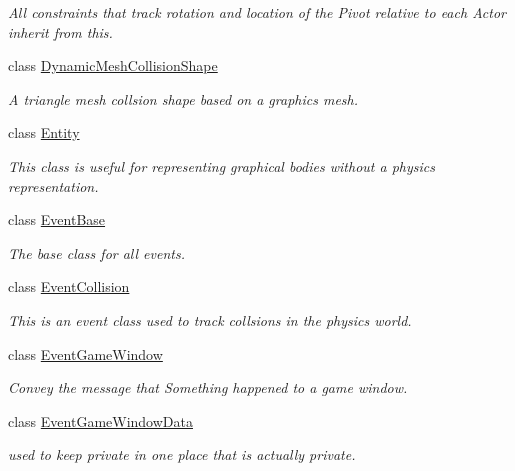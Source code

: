 \begin{DoxyCompactItemize}
\begin{DoxyCompactList}\small\item\em All constraints that track rotation and location of the Pivot relative to each Actor inherit from this. \item\end{DoxyCompactList}\item 
class \hyperlink{classMezzanine_1_1DynamicMeshCollisionShape}{DynamicMeshCollisionShape}
\begin{DoxyCompactList}\small\item\em A triangle mesh collsion shape based on a graphics mesh. \item\end{DoxyCompactList}\item 
class \hyperlink{classMezzanine_1_1Entity}{Entity}
\begin{DoxyCompactList}\small\item\em This class is useful for representing graphical bodies without a physics representation. \item\end{DoxyCompactList}\item 
class \hyperlink{classMezzanine_1_1EventBase}{EventBase}
\begin{DoxyCompactList}\small\item\em The base class for all events. \item\end{DoxyCompactList}\item 
class \hyperlink{classMezzanine_1_1EventCollision}{EventCollision}
\begin{DoxyCompactList}\small\item\em This is an event class used to track collsions in the physics world. \item\end{DoxyCompactList}\item 
class \hyperlink{classMezzanine_1_1EventGameWindow}{EventGameWindow}
\begin{DoxyCompactList}\small\item\em Convey the message that Something happened to a game window. \item\end{DoxyCompactList}\item 
class \hyperlink{classMezzanine_1_1EventGameWindowData}{EventGameWindowData}
\begin{DoxyCompactList}\small\item\em used to keep private in one place that is actually private. \item\end{DoxyCompactList}\item 

\end{DoxyCompactItemize}

